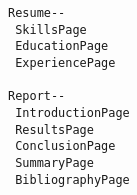 \documentclass[a4paper,12pt]{article}
\begin{document}

\begin{Verbatim}[frame=single, label={Console}]
Resume--
 SkillsPage
 EducationPage
 ExperiencePage
 
Report--
 IntroductionPage
 ResultsPage
 ConclusionPage
 SummaryPage
 BibliographyPage
\end{Verbatim}
\end{document}
